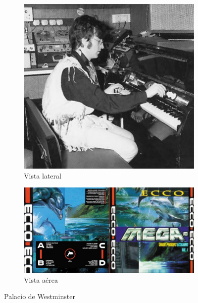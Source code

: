 \documentclass{article}
\begin{document}
  \begin{figure}[h!]
    \centering
    \begin{subfigure}[b]{0.45\linewidth}
      \includegraphics[width=\linewidth]{../../pictures/lennon.jpg}
      \caption{Vista lateral}
      \label{fig:westminster_lateral}
    \end{subfigure}
    \begin{subfigure}[b]{0.45\linewidth}
      \includegraphics[width=\linewidth]{../../pictures/ecco.jpg}
      \caption{Vista aérea}
      \label{fig:westminster_aerea}
    \end{subfigure}
    \caption{Palacio de Westminster}
    \label{fig:westminster}
  \end{figure}
\end{document}
